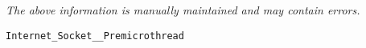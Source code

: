 \label{pkg:internet\_socket\_\_premicrothread}

{\tiny \it The above information is manually maintained and may contain errors.}
\begin{verbatim}
Internet_Socket__Premicrothread
\end{verbatim}
